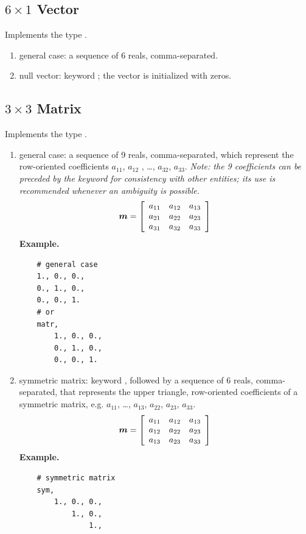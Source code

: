 \subsection{$6 \times 1$ Vector}
\label{sec:Vec6}
Implements the type .
\begin{enumerate}
    \item general case: a sequence of 6 reals, comma-separated.
    \item null vector: keyword ; the vector is initialized 
    with zeros.	
\end{enumerate}
\subsection{$3 \times 3$ Matrix}
\label{sec:Mat3x3}
Implements the type .
\begin{enumerate}
    \item general case: a sequence of 9 reals, comma-separated, which
    represent the row-oriented coefficients $ a_{11} $, $ a_{12}$ ,
    \ldots, $ a_{32} $, $ a_{33} $.
    \emph{Note: the 9 coefficients can be preceded by the keyword
     for consistency with other entities; its use is recommended
    whenever an ambiguity is possible.}
\begin{equation}
	\T{m} = \sqbr{\matr{ccc}{
		a_{11} & a_{12} & a_{13} \\
		a_{21} & a_{22} & a_{23} \\
		a_{31} & a_{32} & a_{33}
	}}
\end{equation}
\textbf{Example.}
\begin{verbatim}
    # general case
    1., 0., 0.,
    0., 1., 0.,
    0., 0., 1.
    # or
    matr,
        1., 0., 0.,
        0., 1., 0.,
        0., 0., 1.
\end{verbatim}

    \item symmetric matrix: keyword , followed by a sequence
    of 6 reals, comma-separated, that represents the upper triangle, 
    row-oriented coefficients of a symmetric matrix, 
    e.g. $ a_{11} $, \ldots , $ a_{13} $, $ a_{22} $, $ a_{23} $, $ a_{33} $.
\begin{equation}
	\T{m} = \sqbr{\matr{ccc}{
		a_{11} & a_{12} & a_{13} \\
		a_{12} & a_{22} & a_{23} \\
		a_{13} & a_{23} & a_{33}
	}}
\end{equation}
\textbf{Example.}
\begin{verbatim}
    # symmetric matrix
    sym,
        1., 0., 0.,
            1., 0.,
                1.,
\end{verbatim}


\end{enumerate}
